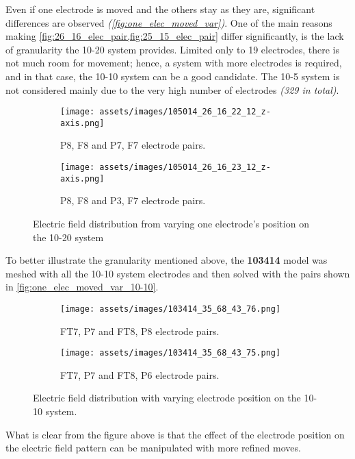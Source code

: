 Even if one electrode is moved and the others stay as they are, significant differences are observed \textit{(\autoref{fig:one_elec_moved_var})}. One of the main reasons making \cref{fig:26_16_elec_pair,fig:25_15_elec_pair} differ significantly, is the lack of granularity the 10-20 system provides. Limited only to 19 electrodes, there is not much room for movement; hence, a system with more electrodes is required, and in that case, the 10-10 system can be a good candidate. The 10-5 system is not considered mainly due to the very high number of electrodes \textit{(329 in total)}.
\begin{figure}[H]
    \centering
    \begin{subfigure}[b]{0.49\textwidth}
        \texttt{[image: assets/images/105014\_26\_16\_22\_12\_z-axis.png]}
        \caption{P8, F8 and P7, F7 electrode pairs.}
        \label{fig:26_16_12_22_elec_pair}
    \end{subfigure}
    \begin{subfigure}[b]{0.49\textwidth}
        \texttt{[image: assets/images/105014\_26\_16\_23\_12\_z-axis.png]}
        \caption{P8, F8 and P3, F7 electrode pairs.}
        \label{fig:25_15_13_24_elec_pair}
    \end{subfigure}
    \caption{Electric field distribution from varying one electrode's position on the 10-20 system}
    \label{fig:one_elec_moved_var}
\end{figure}

To better illustrate the granularity mentioned above, the \textbf{103414} model was meshed with all the 10-10 system electrodes and then solved with the pairs shown in \autoref{fig:one_elec_moved_var_10-10}.

\begin{figure}[H]
    \centering
    \begin{subfigure}[b]{0.49\textwidth}
        \texttt{[image: assets/images/103414\_35\_68\_43\_76.png]}
        \caption{FT7, P7 and FT8, P8 electrode pairs.}
        \label{fig:35_68_43_76_elec_pair}
    \end{subfigure}
    \begin{subfigure}[b]{0.49\textwidth}
        \texttt{[image: assets/images/103414\_35\_68\_43\_75.png]}
        \caption{FT7, P7 and FT8, P6 electrode pairs.}
        \label{fig:35_68_43_75_elec_pair}
    \end{subfigure}
    \caption{Electric field distribution with varying electrode position on the 10-10 system.}
    \label{fig:one_elec_moved_var_10-10}
\end{figure}

What is clear from the figure above is that the effect of the electrode position on the electric field pattern can be manipulated with more refined moves.
